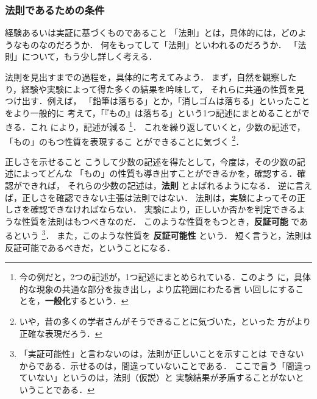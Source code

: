             \subsubsection{法則であるための条件}
            \begin{mysmallsec}{経験あるいは実証に基づくものであること}
            「法則」とは，具体的には，どのようなものなのだろうか．
            何をもってして「法則」といわれるのだろうか．
            「法則」について，もう少し詳しく考える．

            法則を見出すまでの過程を，具体的に考えてみよう．
            まず，自然を観察したり，経験や実験によって得た多くの結果を吟味して，
            それらに共通の性質を見つけ出す．例えば，
            「鉛筆は落ちる」とか，「消しゴムは落ちる」といったことをより一般的に
            考えて，「『もの』は落ちる」という1つ記述にまとめることができる．これ
            により，記述が減る
                \footnote{
                    今の例だと，2つの記述が，1つ記述にまとめられている．このよう
                    に，具体的な現象の共通な部分を抜き出し，より広範囲にわたる言
                    い回しにすることを，\textbf{一般化}するという．
                }．
            これを繰り返していくと，少数の記述で，「もの」のもつ性質を表現するこ
            とができることに気づく
                \footnote{
                    いや，昔の多くの学者さんがそうできることに気づいた，といった
                    方がより正確な表現だろう．
                }．
            \end{mysmallsec}

            \begin{mysmallsec}{正しさを示せること}
            こうして少数の記述を得たとして，今度は，その少数の記述によってどんな
            「もの」の性質も導き出すことができるかを，確認する．確認ができれば，
            それらの少数の記述は，\textbf{法則} とよばれるようになる．
            逆に言えば，正しさを確認できない主張は法則ではない．
            法則は，実験によってその正しさを確認できなければならない．
            実験により，正しいか否かを判定できるような性質を法則はもつべきなのだ．
            このような性質をもつとき，\textbf{反証可能} であるという
                \footnote{
                    「実証可能性」と言わないのは，法則が正しいことを示すことは
                    できないからである．示せるのは，間違っていないことである．
                    ここで言う「間違っていない」というのは，法則（仮説）と
                    実験結果が矛盾することがないということである．
                }．
            また，このような性質を \textbf{反証可能性} という．
            短く言うと，法則は反証可能であるべきだ，ということになる．
            \end{mysmallsec}

